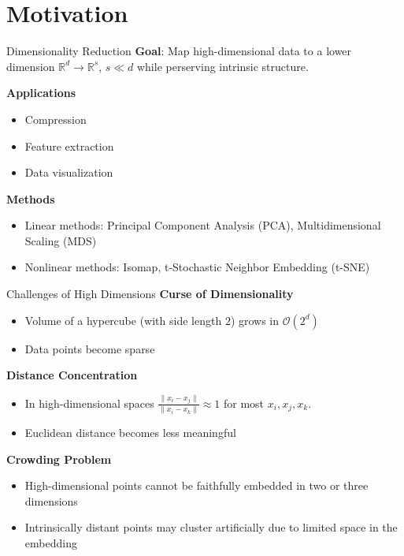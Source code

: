 \section{Motivation}

\begin{frame}{Dimensionality Reduction}
    \textbf{Goal}: Map high-dimensional data to a lower dimension $\mathbb{R}^d \to \mathbb{R}^s$, $s \ll d$ while perserving intrinsic structure.  \pause

    \vspace{5pt}
    \textbf{Applications}
    \begin{itemize}
        \item Compression 
        \item Feature extraction 
        \item Data visualization \pause
    \end{itemize} 
    \vspace{5pt}
    \textbf{Methods}
    \begin{itemize}
        \item Linear methods: Principal Component Analysis (PCA), Multidimensional Scaling (MDS) 
        \item Nonlinear methods: Isomap, t-Stochastic Neighbor Embedding (t-SNE)
    \end{itemize}
\end{frame}

\begin{frame}{Challenges of High Dimensions} 
    \textbf{Curse of Dimensionality}
    \begin{itemize}
        \item Volume of a hypercube (with side length $2$) grows in $\mathcal{O}(2^d)$ 
        \item Data points become sparse 
    \end{itemize}\pause
    \vspace{5pt}
    \textbf{Distance Concentration}
    \begin{itemize}
        \item In high-dimensional spaces $\frac{\lVert x_i - x_j\rVert}{\lVert x_i - x_k\rVert} \approx 1$ for most $x_i, x_j, x_k$. 
        \item Euclidean distance becomes less meaningful 
    \end{itemize}\pause
    \vspace{5pt}
    \textbf{Crowding Problem}
    \begin{itemize}
        \item High-dimensional points cannot be faithfully embedded in two or three dimensions
        \item Intrinsically distant points may cluster artificially due to limited space in the embedding 
    \end{itemize}
\end{frame}


